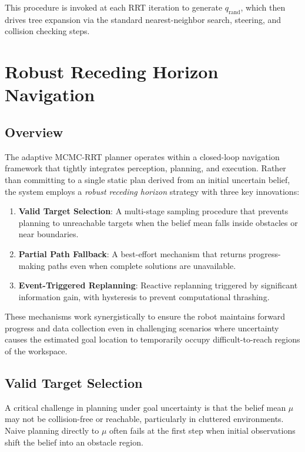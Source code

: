 This procedure is invoked at each RRT iteration to generate $q_{\text{rand}}$, which then drives tree expansion via the standard nearest-neighbor search, steering, and collision checking steps.

\section{Robust Receding Horizon Navigation}

\subsection{Overview}

The adaptive MCMC-RRT planner operates within a closed-loop navigation framework that tightly integrates perception, planning, and execution. Rather than committing to a single static plan derived from an initial uncertain belief, the system employs a \emph{robust receding horizon} strategy with three key innovations:

\begin{enumerate}
    \item \textbf{Valid Target Selection}: A multi-stage sampling procedure that prevents planning to unreachable targets when the belief mean falls inside obstacles or near boundaries.
    \item \textbf{Partial Path Fallback}: A best-effort mechanism that returns progress-making paths even when complete solutions are unavailable.
    \item \textbf{Event-Triggered Replanning}: Reactive replanning triggered by significant information gain, with hysteresis to prevent computational thrashing.
\end{enumerate}

These mechanisms work synergistically to ensure the robot maintains forward progress and data collection even in challenging scenarios where uncertainty causes the estimated goal location to temporarily occupy difficult-to-reach regions of the workspace.

\subsection{Valid Target Selection}

A critical challenge in planning under goal uncertainty is that the belief mean $\mu$ may not be collision-free or reachable, particularly in cluttered environments. Naive planning directly to $\mu$ often fails at the first step when initial observations shift the belief into an obstacle region.

